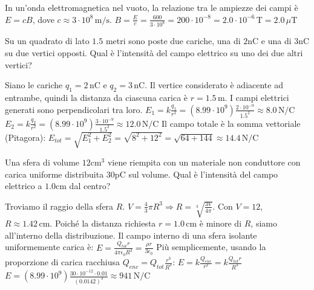 \documentclass[a4paper]{article}
\begin{document}
\begin{snippetsolution}{}
    In un'onda elettromagnetica nel vuoto, la relazione tra le ampiezze dei campi è \(E = cB\), dove \(c \approx 3 \cdot 10^8 \, \text{m/s}\).
    \(B = \frac{E}{c} = \frac{600}{3 \cdot 10^8} = 200 \cdot 10^{-8} = 2.0 \cdot 10^{-6} \, \text{T} = 2.0 \, \mu\text{T}\)
\end{snippetsolution}
\begin{snippetexercise}{}
    Su un quadrato di lato \(1.5\) metri sono poste due cariche, una di \(2 \text{nC}\)
    e una di \(3 \text{nC}\) su due vertici opposti. Qual è l'intensità del campo
    elettrico su uno dei due altri vertici?
\end{snippetexercise}
\begin{snippetsolution}{}
    Siano le cariche \(q_1 = 2\,\text{nC}\) e \(q_2 = 3\,\text{nC}\). Il vertice considerato è adiacente ad entrambe, quindi la distanza da ciascuna carica è \(r = 1.5\,\text{m}\). I campi elettrici generati sono perpendicolari tra loro.
    \(E_1 = k \frac{q_1}{r^2} = (8.99 \cdot 10^9) \frac{2 \cdot 10^{-9}}{1.5^2} \approx 8.0 \, \text{N/C}\)
    \(E_2 = k \frac{q_2}{r^2} = (8.99 \cdot 10^9) \frac{3 \cdot 10^{-9}}{1.5^2} \approx 12.0 \, \text{N/C}\)
    Il campo totale è la somma vettoriale (Pitagora):
    \(E_{tot} = \sqrt{E_1^2 + E_2^2} = \sqrt{8^2 + 12^2} = \sqrt{64 + 144} \approx 14.4 \, \text{N/C}\)
\end{snippetsolution}
\begin{snippetexercise}{}
    Una sfera di volume \(12 \text{cm}^3\) viene riempita con un materiale non conduttore
    con carica uniforme distribuita \(30 \text{pC}\) sul volume.
    Qual è l'intensità del campo elettrico a \(1.0 \text{cm}\) dal centro?
\end{snippetexercise}
\begin{snippetsolution}{}
    Troviamo il raggio della sfera \(R\). \(V = \frac{4}{3}\pi R^3 \Rightarrow R = \sqrt[3]{\frac{3V}{4\pi}}\).
    Con \(V=12\), \(R \approx 1.42\,\text{cm}\). Poiché la distanza richiesta \(r=1.0\,\text{cm}\) è minore di \(R\), siamo all'interno della distribuzione.
    Il campo interno di una sfera isolante uniformemente carica è:
    \(E = \frac{Q_{tot} r}{4\pi \epsilon_0 R^3} = \frac{\rho r}{3\epsilon_0}\)
    Più semplicemente, usando la proporzione di carica racchiusa \(Q_{enc} = Q_{tot} \frac{r^3}{R^3}\):
    \(E = k \frac{Q_{enc}}{r^2} = k \frac{Q_{tot} r}{R^3}\)
    \(E = (8.99 \cdot 10^9) \frac{30 \cdot 10^{-12} \cdot 0.01}{(0.0142)^3} \approx 941 \, \text{N/C}\)
\end{snippetsolution}
\end{document}
